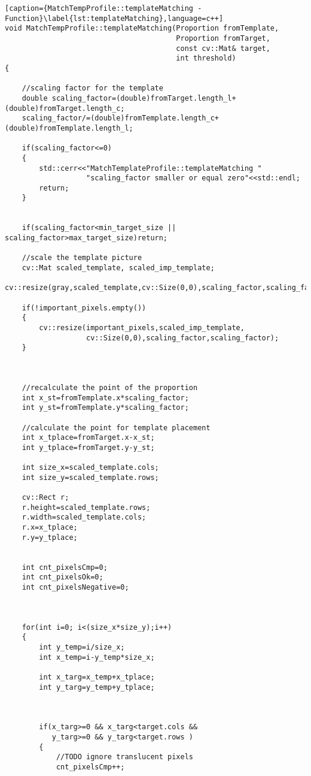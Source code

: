 \newpage
\begin{lstlisting}[caption={MatchTempProfile::templateMatching - Function}\label{lst:templateMatching},language=c++]
void MatchTempProfile::templateMatching(Proportion fromTemplate, 
                                        Proportion fromTarget,
                                        const cv::Mat& target,
                                        int threshold)
{

	//scaling factor for the template
	double scaling_factor=(double)fromTarget.length_l+(double)fromTarget.length_c;
	scaling_factor/=(double)fromTemplate.length_c+(double)fromTemplate.length_l;

	if(scaling_factor<=0)
	{
		std::cerr<<"MatchTemplateProfile::templateMatching "
		           "scaling_factor smaller or equal zero"<<std::endl;
		return;
	}


	if(scaling_factor<min_target_size || scaling_factor>max_target_size)return;

	//scale the template picture
	cv::Mat scaled_template, scaled_imp_template;
	cv::resize(gray,scaled_template,cv::Size(0,0),scaling_factor,scaling_factor);

	if(!important_pixels.empty())
	{
		cv::resize(important_pixels,scaled_imp_template,
		           cv::Size(0,0),scaling_factor,scaling_factor);
	}



	//recalculate the point of the proportion
	int x_st=fromTemplate.x*scaling_factor;
	int y_st=fromTemplate.y*scaling_factor;

	//calculate the point for template placement
	int x_tplace=fromTarget.x-x_st;
	int y_tplace=fromTarget.y-y_st;

	int size_x=scaled_template.cols;
	int size_y=scaled_template.rows;

	cv::Rect r;
	r.height=scaled_template.rows;
	r.width=scaled_template.cols;
	r.x=x_tplace;
	r.y=y_tplace;


	int cnt_pixelsCmp=0;
	int cnt_pixelsOk=0;
	int cnt_pixelsNegative=0;



	for(int i=0; i<(size_x*size_y);i++)
	{
		int y_temp=i/size_x;
		int x_temp=i-y_temp*size_x;

		int x_targ=x_temp+x_tplace;
		int y_targ=y_temp+y_tplace;



		if(x_targ>=0 && x_targ<target.cols &&
		   y_targ>=0 && y_targ<target.rows )
		{
			//TODO ignore translucent pixels
			cnt_pixelsCmp++;


\end{lstlisting}
